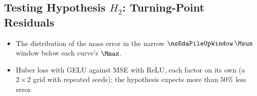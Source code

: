 \subsection{Testing Hypothesis \texorpdfstring{$H_2$}{H2}: Turning-Point Residuals}
\label{sec:h2}

\begin{itemize}
  \item The distribution of the mass error in the narrow $\nsEdaPileUpWindow\,\Msun$ window below each curve's $\Mmax$.
  \item Huber loss with GELU against MSE with ReLU, each factor on its own (a $2 \times 2$ grid with repeated seeds); the hypothesis expects more than $50\%$ less error.
\end{itemize}
